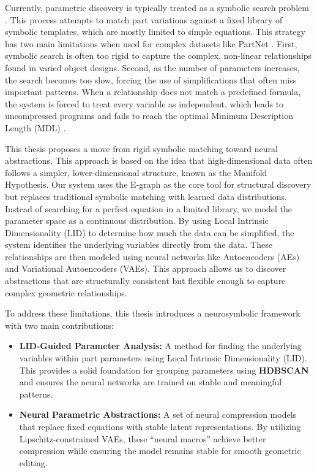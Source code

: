 \documentclass{thesis}
\begin{document}
Currently, parametric discovery is typically treated as a symbolic search problem \cite{ShapeMOD}. This process attempts to match part variations against a fixed library of symbolic templates, which are mostly limited to simple equations. This strategy has two main limitations when used for complex datasets like PartNet \cite{Yu_2019_CVPR, Mo_2019_CVPR}. First, symbolic search is often too rigid to capture the complex, non-linear relationships found in varied object designs. Second, as the number of parameters increases, the search becomes too slow, forcing the use of simplifications that often miss important patterns. When a relationship does not match a predefined formula, the system is forced to treat every variable as independent, which leads to uncompressed programs and fails to reach the optimal Minimum Description Length (MDL) \cite{Rissanen1978}.

This thesis proposes a move from rigid symbolic matching toward neural abstractions. This approach is based on the idea that high-dimensional data often follows a simpler, lower-dimensional structure, known as the Manifold Hypothesis. Our system uses the E-graph as the core tool for structural discovery but replaces traditional symbolic matching with learned data distributions. Instead of searching for a perfect equation in a limited library, we model the parameter space as a continuous distribution. By using Local Intrinsic Dimensionality (LID) \cite{IntrinsicDim, faccotwonn} to determine how much the data can be simplified, the system identifies the underlying variables directly from the data. These relationships are then modeled using neural networks like Autoencoders (AEs) and Variational Autoencoders (VAEs). This approach allows us to discover abstractions that are structurally consistent but flexible enough to capture complex geometric relationships.

To address these limitations, this thesis introduces a neurosymbolic framework with two main contributions:

\begin{itemize}
    \item \textbf{LID-Guided Parameter Analysis:} A method for finding the underlying variables within part parameters using Local Intrinsic Dimensionality (LID). This provides a solid foundation for grouping parameters using \textbf{HDBSCAN} and ensures the neural networks are trained on stable and meaningful patterns.
    \item \textbf{Neural Parametric Abstractions:} A set of neural compression models that replace fixed equations with stable latent representations. By utilizing Lipschitz-constrained VAEs, these ``neural macros'' achieve better compression while ensuring the model remains stable for smooth geometric editing.
\end{itemize}
\end{document}
